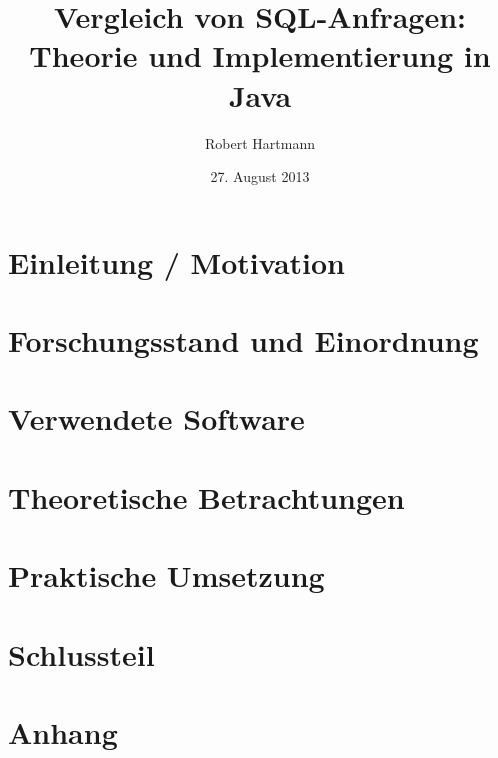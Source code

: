 \documentclass[12pt]{scrreprt}
\author{Robert Hartmann}
\title{Vergleich von SQL-Anfragen: Theorie und Implementierung in Java}
\date{27. August 2013}
\theoremstyle{remark}
\begin{document}

%

\pagestyle{plain}
\tableofcontents

\onehalfspacing

\chapter{Einleitung / Motivation}
\label{chap:introduction}


\chapter{Forschungsstand und Einordnung}
\label{chap:forschung}


\chapter{Verwendete Software}
\label{chap:software}


\chapter{Theoretische Betrachtungen}
\label{chap:theorie}



\chapter{Praktische Umsetzung}
\label{chap:praxis}


\chapter{Schlussteil}
\label{chap:ausblick}


%
\printbibliography



\chapter{Anhang}




\end{document}

